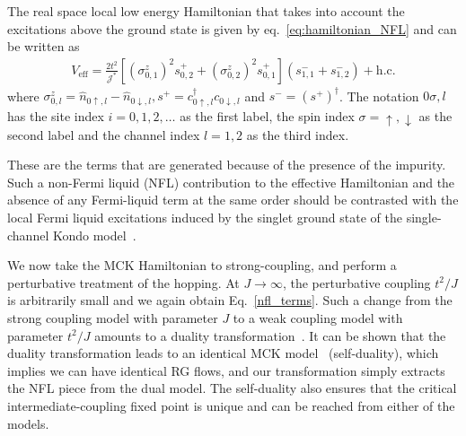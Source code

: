 \documentclass[reprint,prb,superscriptaddress]{revtex4-2}
\begin{document}
The real space local low energy Hamiltonian that takes into account the excitations above the ground state is given by eq.~\ref{eq:hamiltonian_NFL} and can be written as
\begin{equation}\begin{aligned}
	\label{nfl_terms}
	V_\text{eff} = \frac{2t^2}{{\mathcal{J}^*}}\left[\left(\sigma^z_{0,1}\right)^2 s^+_{0,2} + \left(\sigma^z_{0,2}\right)^2 s^+_{0,1}\right] \left(s^-_{1,1} + s^-_{1,2}\right) + \text{h.c.}
\end{aligned}\end{equation}
where \(\sigma^z_{0,l} = \hat n_{0\uparrow,l} - \hat n_{0\downarrow,l}, s^+ = c^\dagger_{0 \uparrow,l}c_{0 \downarrow,l}\) and \(s^- = \left(s^+\right)^\dagger\). The notation \(0\sigma,l\) has the site index \(i=0,1,2,\ldots\) as the first label, the spin index \(\sigma=\uparrow,\downarrow\) as the second label and the channel index \(l=1,2\) as the third index.

These are the terms that are generated because of the presence of the impurity. Such a non-Fermi liquid (NFL) contribution to the effective Hamiltonian and the absence of any Fermi-liquid term at the same order should be contrasted with the local Fermi liquid excitations induced by the singlet ground state of the single-channel Kondo model~\cite{nozieres1974fermi,wilson1975renormalization,hewson1993}. 

We now take the MCK Hamiltonian to strong-coupling, and perform a perturbative treatment of the hopping. At \(J \to \infty\), the perturbative coupling \(t^2/J\) is arbitrarily small and we again obtain Eq.~\ref{nfl_terms}. Such a change from the strong coupling model with parameter \(J\) to a weak coupling model with parameter \(t^2/J\) amounts to a duality transformation~\cite{kroha_kolf_2007,zitko_fabrizio_2017}. It can be shown that the duality transformation leads to an identical MCK model~\cite{kroha_kolf_2007} (self-duality), which implies we can have identical RG flows, and our transformation simply extracts the NFL piece from the dual model. The self-duality also ensures that the critical intermediate-coupling fixed point is unique and can be reached from either of the models.
\end{document}
